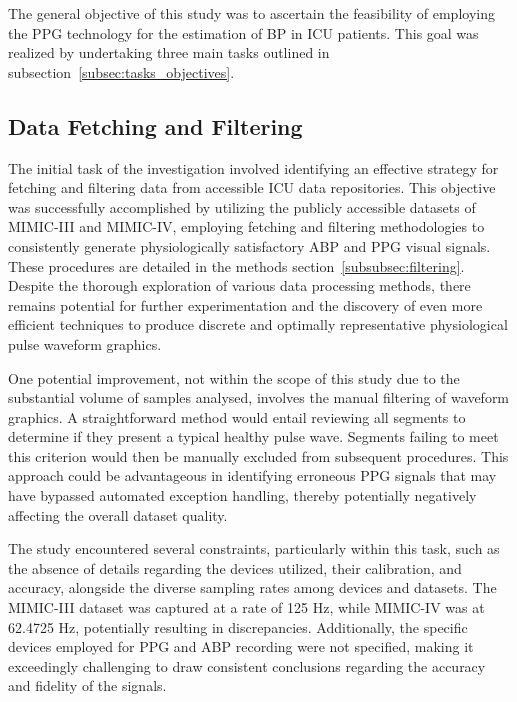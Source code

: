 The general objective of this study was to ascertain the feasibility of employing the PPG technology for the estimation of BP in ICU patients.
This goal was realized by undertaking three main tasks outlined in subsection~\ref{subsec:tasks_objectives}.

\subsection{Data Fetching and Filtering}
\label{subsec:data-fetching-and-filtering}

The initial task of the investigation involved identifying an effective strategy for fetching and filtering data from accessible ICU data repositories.
This objective was successfully accomplished by utilizing the publicly accessible datasets of MIMIC-III and MIMIC-IV,
employing fetching and filtering methodologies to consistently generate physiologically satisfactory ABP and PPG visual signals.
These procedures are detailed in the methods section~\ref{subsubsec:filtering}.
Despite the thorough exploration of various data processing methods, there remains potential for further experimentation and the discovery of even more efficient techniques
to produce discrete and optimally representative physiological pulse waveform graphics.

One potential improvement, not within the scope of this study due to the substantial volume of samples analysed, involves the manual filtering of waveform graphics.
A straightforward method would entail reviewing all segments to determine if they present a typical healthy pulse wave.
Segments failing to meet this criterion would then be manually excluded from subsequent procedures.
This approach could be advantageous in identifying erroneous PPG signals that may have bypassed automated exception handling, thereby potentially negatively affecting the overall dataset quality.

The study encountered several constraints, particularly within this task, such as the absence of details regarding the devices utilized,
their calibration, and accuracy, alongside the diverse sampling rates among devices and datasets.
The MIMIC-III dataset was captured at a rate of 125 Hz, while MIMIC-IV was at 62.4725 Hz, potentially resulting in discrepancies.
Additionally, the specific devices employed for PPG and ABP recording were not specified, making it exceedingly challenging to draw consistent conclusions regarding the accuracy and fidelity of the signals.

